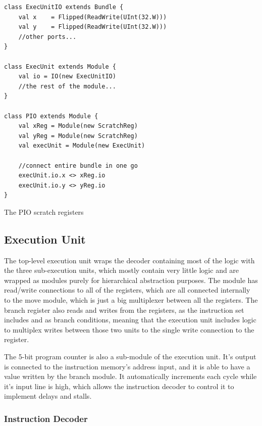 \begin{listing}[h!]
    \vspace{0.5cm}
    \begin{verbatim}
class ExecUnitIO extends Bundle {
    val x    = Flipped(ReadWrite(UInt(32.W)))
    val y    = Flipped(ReadWrite(UInt(32.W)))
    //other ports...          
}

class ExecUnit extends Module {
    val io = IO(new ExecUnitIO)
    //the rest of the module...
}

class PIO extends Module {
    val xReg = Module(new ScratchReg)
    val yReg = Module(new ScratchReg)
    val execUnit = Module(new ExecUnit)

    //connect entire bundle in one go
    execUnit.io.x <> xReg.io
    execUnit.io.y <> yReg.io
}
    \end{verbatim}
    \caption{The PIO scratch registers}
    \label{lst:connection}
\end{listing}

\subsection{Execution Unit}

The top-level execution unit wraps the decoder containing most of the logic with the three sub-execution units, which mostly contain very little logic and are wrapped as modules purely for hierarchical abstraction purposes. The module has read/write connections to all of the registers, which are all connected internally to the move module, which is just a big multiplexer between all the registers. The branch register also reads and writes from the registers, as the instruction set includes  and  as branch conditions, meaning that the execution unit includes logic to multiplex writes between those two units to the single write connection to the register.

The 5-bit program counter is also a sub-module of the execution unit. It's output is connected to the instruction memory's address input, and it is able to have a value written by the branch module. It automatically increments each cycle while it's  input line is high, which allows the instruction decoder to control it to implement delays and stalls.

\subsubsection{Instruction Decoder}

